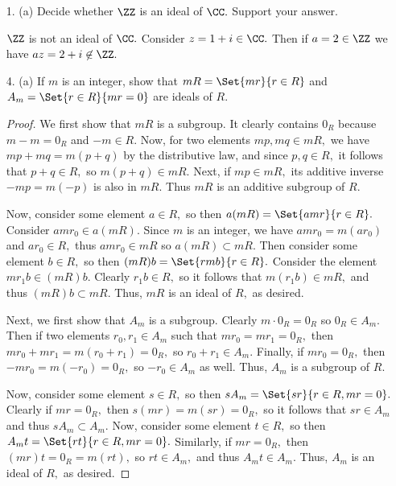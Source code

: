 \documentclass{article}
\begin{document}
\begin{itemize}
	\item[1.] (a) Decide whether $\ZZ$ is an ideal of $\CC.$ Support your answer.
		\begin{soln}
			$\ZZ$ is not an ideal of $\CC.$ Consider $z=1+i\in\CC.$ Then if $a=2\in \ZZ$ we have $az=2+i\not\in\ZZ.$
		\end{soln}

	\item[4.] (a) If $m$ is an integer, show that $mR=\Set{mr}{r\in R}$ and $A_m=\Set{r\in R}{mr=0}$ are ideals of $R.$
		\begin{proof}
			We first show that $mR$ is a subgroup. It clearly contains $0_R$ because $m-m=0_R$ and $-m\in R.$ Now, for two elements $mp, mq\in mR,$ we have $mp+mq=m(p+q)$ by the distributive law, and since $p, q\in R,$ it follows that $p+q\in R,$ so $m(p+q)\in mR.$ Next, if $mp\in mR,$ its additive inverse $-mp=m(-p)$ is also in $mR.$ Thus $mR$ is an additive subgroup of $R.$ 

			Now, consider some element $a\in R,$ so then $a(mR)=\Set{amr}{r\in R}.$ Consider $amr_0\in a(mR).$ Since $m$ is an integer, we have $amr_0= m(ar_0)$ and $ar_0\in R,$ thus $amr_0\in mR$ so $a(mR)\subset mR.$ Then consider some element $b\in R,$ so then $(mR)b=\Set{rmb}{r\in R}.$ Consider the element $mr_1b\in (mR)b.$ Clearly $r_1b\in R,$ so it follows that $m(r_1b)\in mR,$ and thus $(mR)b\subset mR.$ Thus, $mR$ is an ideal of $R,$ as desired.

			Next, we first show that $A_m$ is a subgroup. Clearly $m\cdot 0_R=0_R$ so $0_R\in A_m.$ Then if two elements $r_0, r_1\in A_m$ such that $mr_0=mr_1=0_R,$ then $mr_0+mr_1=m(r_0+r_1)=0_R,$ so $r_0+r_1\in A_m.$ Finally, if $mr_0=0_R,$ then $-mr_0=m(-r_0)=0_R,$ so $-r_0\in A_m$ as well. Thus, $A_m$ is a subgroup of $R.$

			Now, consider some element $s\in R,$ so then $sA_m=\Set{sr}{r\in R, mr=0}.$ Clearly if $mr=0_R,$ then $s(mr)=m(sr)=0_R,$ so it follows that $sr\in A_m$ and thus $sA_m\subset A_m.$ Now, consider some element $t\in R,$ so then $A_m t=\Set{rt}{r\in R, mr=0}.$ Similarly, if $mr=0_R,$ then $(mr)t=0_R=m(rt),$ so $rt\in A_m,$ and thus $A_m t\in A_m.$ Thus, $A_m$ is an ideal of $R,$ as desired.
		\end{proof}


\end{itemize}
\end{document}
